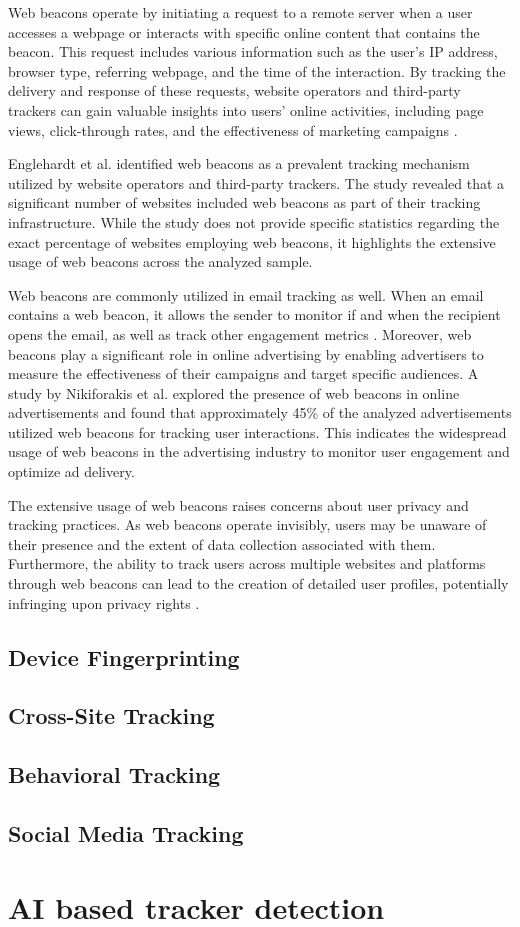 Web beacons operate by initiating a request to a remote server when a user accesses a webpage
or interacts with specific online content that contains the beacon. This request includes various
information such as the user's IP address, browser type, referring webpage, and the time of
the interaction. By tracking the delivery and response of these requests, website operators
and third-party trackers can gain valuable insights into users' online activities,
including page views, click-through rates, and the effectiveness of marketing campaigns \cite{zimmer2010but}.

Englehardt et al. \cite{englehardt2016online} identified web beacons as a prevalent tracking mechanism utilized
by website operators and third-party trackers. The study revealed that a significant number of websites included
web beacons as part of their tracking infrastructure. While the study does not provide specific statistics regarding
the exact percentage of websites employing web beacons, it highlights the extensive usage of web beacons across the analyzed sample.

Web beacons are commonly utilized in email tracking as well. When an email contains a web beacon, it allows the sender to monitor
if and when the recipient opens the email, as well as track other engagement metrics \cite{gurses2011engineering}. 
Moreover, web beacons play a significant role in online advertising by enabling advertisers to measure the effectiveness
of their campaigns and target specific audiences. A study by Nikiforakis et al. \cite{nikiforakis2013cookieless}
explored the presence of web beacons in online advertisements and found that approximately 45\% of the analyzed advertisements
utilized web beacons for tracking user interactions. This indicates the widespread usage of web beacons in the advertising
industry to monitor user engagement and optimize ad delivery.

The extensive usage of web beacons raises concerns about user privacy and tracking practices. As web beacons operate invisibly,
users may be unaware of their presence and the extent of data collection associated with them. Furthermore, the ability to track
users across multiple websites and platforms through web beacons can lead to the creation of detailed user profiles,
potentially infringing upon privacy rights \cite{acquisti2015privacy}.



\subsection{Device Fingerprinting}

\subsection{Cross-Site Tracking}

\subsection{Behavioral Tracking}

\subsection{Social Media Tracking}

\section{AI based tracker detection}

